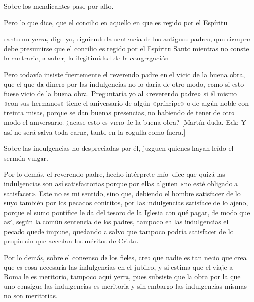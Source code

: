 Sobre los mendicantes paso por alto.

Pero lo que dice, que el concilio en aquello en que es regido por el Espíritu

santo no yerra, digo yo, siguiendo la sentencia de los antiguos padres, que siempre debe presumirse que el concilio es regido por el Espíritu Santo mientras no conste lo contrario, a saber, la ilegitimidad de la congregación.

Pero todavía insiste fuertemente el reverendo padre en el vicio de la buena obra, que el que da dinero por las indulgencias no lo daría de otro modo, como si esto fuese vicio de la buena obra. Preguntaría yo al «reverendo padre» si él mismo «con sus hermanos» tiene el aniversario de algún «príncipe» o de algún noble con treinta misas, porque se dan buenas presencias, no habiendo de tener de otro modo el aniversario: ¿acaso esto es vicio de la buena obra? [Martín duda. Eck: Y así no será salva toda carne, tanto en la cogulla como fuera.]

Sobre las indulgencias no despreciadas por él, juzguen quienes hayan leído el sermón vulgar.

Por lo demás, el reverendo padre, hecho intérprete mío, dice que quizá las indulgencias son así satisfactorias porque por ellas alguien «no esté obligado a satisfacer». Este no es mi sentido, sino que, debiendo el hombre satisfacer de lo suyo también por los pecados contritos, por las indulgencias satisface de lo ajeno, porque el sumo pontífice le da del tesoro de la Iglesia con qué pagar, de modo que así, según la común sentencia de los padres, tampoco en las indulgencias el pecado quede impune, quedando a salvo que tampoco podría satisfacer de lo propio sin que accedan los méritos de Cristo.

Por lo demás, sobre el consenso de los fieles, creo que nadie es tan necio que crea que es cosa necesaria las indulgencias en el jubileo, y si estima que el viaje a Roma le es meritorio, tampoco aquí yerra, pues subsiste que la obra por la que uno consigue las indulgencias es meritoria y sin embargo las indulgencias mismas no son meritorias.

